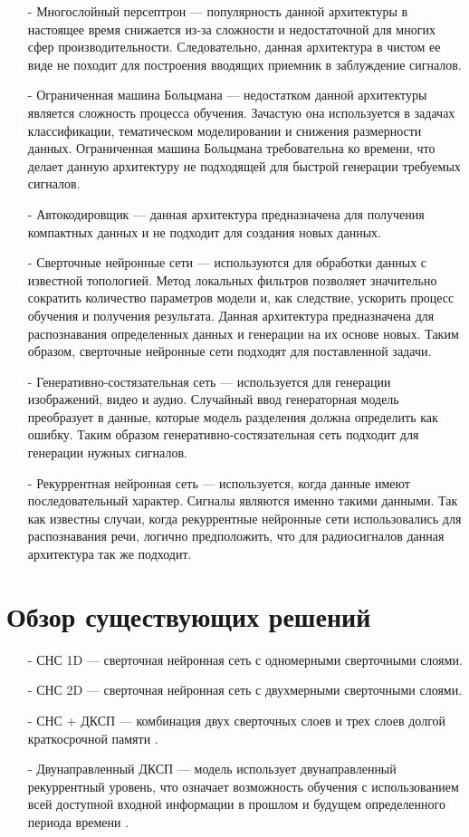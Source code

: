\begin{itemize}
	\item[-] Многослойный персептрон --- популярность данной архитектуры в настоящее время снижается из-за сложности и недостаточной для многих сфер производительности. Следовательно, данная архитектура в чистом ее виде не походит для построения вводящих приемник в заблуждение сигналов.
	\item[-] Ограниченная машина Больцмана --- недостатком данной архитектуры является сложность процесса обучения. Зачастую она используется в задачах классификации, тематическом моделировании и снижения размерности данных. Ограниченная машина Больцмана требовательна ко времени, что делает данную архитектуру не подходящей для быстрой генерации требуемых сигналов.
	\item[-] Автокодировщик --- данная архитектура предназначена для получения компактных данных и не подходит для создания новых данных.
	\item[-] Сверточные нейронные сети --- используются для обработки данных с известной топологией. Метод локальных фильтров позволяет значительно сократить количество параметров модели и, как следствие, ускорить процесс обучения и получения результата. Данная архитектура предназначена для распознавания определенных данных и генерации на их основе новых. Таким образом, сверточные нейронные сети подходят для поставленной задачи.
	\item[-] Генеративно-состязательная сеть --- используется для генерации изображений, видео и аудио. Случайный ввод генераторная модель преобразует в данные, которые модель разделения должна определить как ошибку. Таким образом генеративно-состязательная сеть подходит для генерации нужных сигналов.
	\item[-] Рекуррентная нейронная сеть --- используется, когда данные имеют последовательный характер. Сигналы являются именно такими данными. Так как известны случаи, когда рекуррентные нейронные сети использовались для распознавания речи, логично предположить, что для радиосигналов данная архитектура так же подходит.
\end{itemize}

\section{Обзор существующих решений}

\begin{itemize}
	\item[-] СНС 1D --- сверточная нейронная сеть с одномерными сверточными слоями.
	\item[-] СНС 2D --- сверточная нейронная сеть с двухмерными сверточными слоями.
	\item[-] СНС + ДКСП --- комбинация двух сверточных слоев и трех слоев долгой краткосрочной памяти \cite{lstmis}.
	\item[-] Двунаправленный ДКСП --- модель использует двунаправленный рекуррентный уровень, что означает возможность обучения с использованием всей доступной входной информации в прошлом и будущем определенного периода времени \cite{doublelstm}.
\end{itemize}

